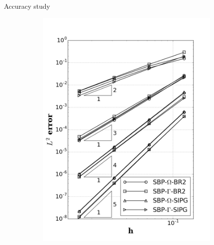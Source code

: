\documentclass{beamer}
\begin{document}
\begin{frame}{Accuracy study}
    \vskip -4mm
    \begin{figure}  
        \centering
        \begin{subfigure}[b]{0.425\linewidth}
            \centering
            \includegraphics[width=1.0\linewidth]{figures/p_accuracy.png}
        \end{subfigure}%
        \begin{subfigure}[b]{0.425\linewidth}
            \centering

\end{subfigure}
\end{figure}
\end{frame}
\end{document}
